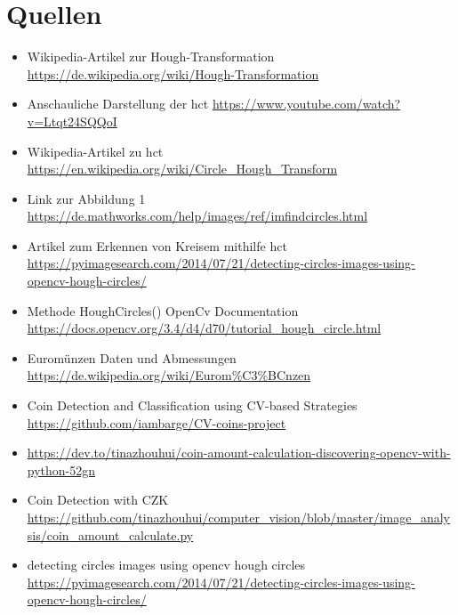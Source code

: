 \documentclass[12pt, a4paper]{scrartcl}
\begin{document}
\section{Quellen}
\begin{flushleft}
\begin{itemize}
  \item Wikipedia-Artikel zur Hough-Transformation
  \url{https://de.wikipedia.org/wiki/Hough-Transformation}
  \item Anschauliche Darstellung der \acf{hct}
  \url{https://www.youtube.com/watch?v=Ltqt24SQQoI}
  \item Wikipedia-Artikel zu \acl{hct}
  \url{https://en.wikipedia.org/wiki/Circle_Hough_Transform}
  \item Link zur Abbildung 1
  \url{https://de.mathworks.com/help/images/ref/imfindcircles.html}
  \item Artikel zum Erkennen von Kreisem mithilfe \acs{hct}\\
  \url{https://pyimagesearch.com/2014/07/21/detecting-circles-images-using-opencv-hough-circles/}
  \item Methode HoughCircles() OpenCv Documentation
  \url {https://docs.opencv.org/3.4/d4/d70/tutorial_hough_circle.html}
  \item Euromünzen Daten und Abmessungen
  \url {https://de.wikipedia.org/wiki/Eurom%C3%BCnzen}
  \item Coin Detection and Classification using CV-based Strategies
  \url {https://github.com/iambarge/CV-coins-project}
  \item 
  \url {https://dev.to/tinazhouhui/coin-amount-calculation-discovering-opencv-with-python-52gn}
  \item Coin Detection with CZK
  \url {https://github.com/tinazhouhui/computer_vision/blob/master/image_analysis/coin_amount_calculate.py}
  \item detecting circles images using opencv hough circles
  \url {https://pyimagesearch.com/2014/07/21/detecting-circles-images-using-opencv-hough-circles/}
  
\end{itemize}
\end{flushleft}
\end{document}
